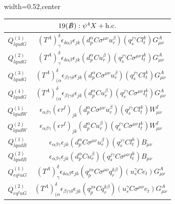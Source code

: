 \begin{table}[H]
\begin{center}
\begin{adjustbox}{width=0.52\textwidth,center}
\small
\begin{minipage}[t]{7.8cm}
\renewcommand{\arraystretch}{1.5}
\begin{tabular}[t]{c|c}
\multicolumn{2}{c}{\boldmath$19(\slashed B):\psi^4X + \mathrm{h.c.}$} \\
\hline
$Q_{lqudG}^{(1)}$  &  $(T^A)_\gamma^\delta \epsilon_{\delta\alpha\beta}   \epsilon_{jk} (d_p^{\alpha} C \sigma^{\mu\nu} u_r^{\beta}) (q_s^{j\gamma} C l_t^k) G^A_{\mu\nu}$ \\
%
$Q_{lqudG}^{(2)}$  &  $(T^A)_\gamma^\delta \epsilon_{\delta\alpha\beta} \epsilon_{jk} (d_p^{\alpha} C u_r^{\beta}) (q_s^{j\gamma} C \sigma^{\mu\nu} l_t^k) G^A_{\mu\nu}$ \\
%
$Q_{lqudG}^{(3)}$  &  $(T^A)_{(\alpha}^\delta \epsilon_{\beta)\gamma\delta}  \epsilon_{jk}   (d_p^{\alpha} C \sigma^{\mu\nu} u_r^{\beta}) (q_s^{j\gamma} C l_t^k) G^A_{\mu\nu}$ \\
%
$Q_{lqudG}^{(4)}$  &  $(T^A)_{(\alpha}^\delta \epsilon_{\beta)\gamma\delta} \epsilon_{jk} (d_p^{\alpha} C u_r^{\beta}) (q_s^{j\gamma} C \sigma^{\mu\nu} l_t^k) G^A_{\mu\nu}$ \\
%
$Q_{lqudW}^{(1)}$  &  $\epsilon_{\alpha\beta\gamma} (\epsilon \tau^I)_{jk} (d_p^{\alpha} C \sigma^{\mu\nu} u_r^{\beta}) (q_s^{j\gamma} C l_t^k) W^I_{\mu\nu}$ \\
%
$Q_{lqudW}^{(2)}$  &  $\epsilon_{\alpha\beta\gamma} (\epsilon \tau^I)_{jk} (d_p^{\alpha} C u_r^{\beta}) (q_s^{j\gamma} C \sigma^{\mu\nu} l_t^k) W^I_{\mu\nu}$ \\
%
$Q_{lqudB}^{(1)}$  &  $\epsilon_{\alpha\beta\gamma} \epsilon_{jk} (d_p^{\alpha} C \sigma^{\mu\nu} u_r^{\beta}) (q_s^{j\gamma} C l_t^k)  B_{\mu\nu}$ \\
%
$Q_{lqudB}^{(2)}$  &  $\epsilon_{\alpha\beta\gamma} \epsilon_{jk} (d_p^{\alpha} C u_r^{\beta}) (q_s^{j\gamma} C \sigma^{\mu\nu} l_t^k) B_{\mu\nu}$ \\
%
$Q_{eq^2uG}^{(1)}$  &  $(T^A)_\gamma^\delta \epsilon_{\delta\alpha\beta}  \epsilon_{jk} (q_p^{j\alpha} C \sigma^{\mu\nu} q_r^{k\beta}) (u_s^{\gamma}  C e_t) G^A_{\mu\nu}$ \\
%
$Q_{eq^2uG}^{(2)}$  &  $(T^A)_{(\alpha}^\delta \epsilon_{\beta)\gamma\delta}   \epsilon_{jk} (q_p^{j\alpha} C q_r^{k\beta}) (u_s^{\gamma} C \sigma^{\mu\nu} e_t) G^A_{\mu\nu}$ \\

\end{tabular}
\end{minipage}
\end{adjustbox}
\end{center}
\end{table}

